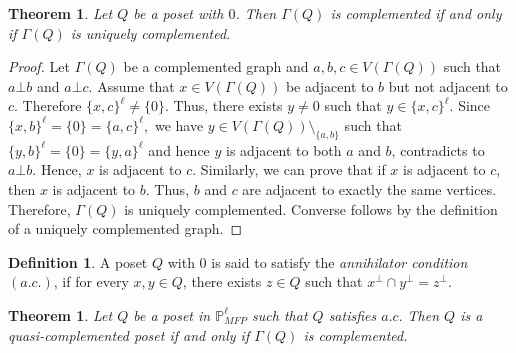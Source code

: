 \documentclass[10pt,one side,emlines]{amsart}
\newtheorem{thm}[lem]{Theorem}
\theoremstyle{definition}
\newtheorem{defn}[lem]{Definition}
\begin{document}
\begin{thm}\label{1.11}
	Let $Q$ be a poset with $0$. Then $\Gamma(Q)$ is complemented if and only if $\Gamma(Q)$ is uniquely complemented.
\end{thm}
\begin{proof} Let $\Gamma(Q)$ be a complemented graph and $a, b, c \in V(\Gamma(Q))$ such that $a\bot b$ and $a\bot c$. Assume that $x \in V(\Gamma(Q))$ be adjacent to $b$ but not adjacent to $c$. Therefore $\{x,c\}^{\ell}\neq \{0\}$. Thus, there exists $y \neq 0$ such that $y \in \{x,c\}^{\ell}$. Since  $ \{x,b\}^{\ell}=\{0\}=\{a,c\}^{\ell},$ we have  $y \in V(\Gamma(Q))\setminus_{\{a,b\}}$ such that $ \{y,b\}^{\ell}=\{0\}=\{y,a\}^{\ell}$ and hence $y$ is adjacent to both $a$ and $b$, contradicts to $ a \bot b$. Hence, $x$ is adjacent to $c$. Similarly, we can prove that if $x$ is adjacent to $c$, then $x$ is adjacent to $b$. Thus, $b$ and $c$ are adjacent to exactly the same vertices. Therefore,  $\Gamma(Q)$ is uniquely complemented. Converse follows by the definition of a uniquely complemented graph.
\end{proof}

\begin{defn} A poset $Q$ with $0$ is said to satisfy the  \textit{annihilator condition $(a.c.)$}, if for every $ x,y \in Q$, there exists $z \in Q$  such that $x^{\perp} \cap y^{\perp}=z^{\perp}$.
\end{defn}	

\begin{thm}\label{1.11'} Let $Q$ be a poset in $\mathbb{P}^{\ell}_{MFP}$ such that $Q$ satisfies $a.c.$ Then $Q$ is a quasi-complemented poset if and only if $\Gamma(Q)$ is complemented.  
\end{thm}               
\end{document}
